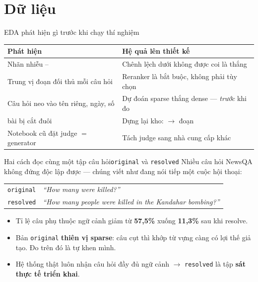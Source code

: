 \section{Dữ liệu}

\begin{frame}{EDA phát hiện gì trước khi chạy thí nghiệm}
  \small
  \begin{tabularx}{\textwidth}{@{}p{4.2cm} L@{}}
    \toprule
    \textbf{Phát hiện} & \textbf{Hệ quả lên thiết kế} \\
    \midrule
    Nhãn nhiễu \NumNoiseFloor{}--\NumNoiseCeiling{} &
      Chênh lệch dưới \NumNoiseFloor{} không được coi là thắng \\
    Trung vị \NumDistractorMedian{} đoạn đối thủ mỗi câu hỏi &
      Reranker là bắt buộc, không phải tùy chọn \\
    Câu hỏi neo vào tên riêng, ngày, số &
      Dự đoán sparse thắng dense --- \emph{trước} khi đo \\
    \NumCorpusRestored{} bài bị cắt đuôi &
      Dựng lại kho: \NumCorpusChunksVone{} $\rightarrow$ \NumCorpusChunks{} đoạn \\
    Notebook cũ đặt judge $=$ generator &
      Tách judge sang nhà cung cấp khác \\
    \bottomrule
  \end{tabularx}

\end{frame}

\begin{frame}{Hai cách đọc cùng một tập câu hỏi}{\texttt{original} và \texttt{resolved}}
  \small
  Nhiều câu hỏi NewsQA không đứng độc lập được --- chúng viết như đang nói tiếp
  một cuộc hội thoại:

  \begin{center}
    \begin{tabular}{@{}l l@{}}
      \texttt{original} & \emph{``How many were killed?''} \\
      \texttt{resolved} & \emph{``How many people were killed in the Kandahar bombing?''} \\
    \end{tabular}
  \end{center}

  \begin{itemize}
    \item Tỉ lệ câu phụ thuộc ngữ cảnh giảm từ \textbf{57,5\%} xuống \textbf{11,3\%} sau khi resolve.
    \item Bản \texttt{original} \textbf{thiên vị sparse}: câu cụt thì khớp từ vựng
          càng có lợi thế giả tạo. Đo trên đó là tự khen mình.
    \item Hệ thống thật luôn nhận câu hỏi đầy đủ ngữ cảnh $\rightarrow$
          \texttt{resolved} là tập \textbf{sát thực tế triển khai}.
  \end{itemize}

\end{frame}
